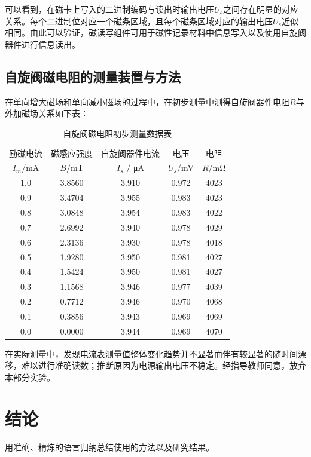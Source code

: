 \documentclass{thuemp}
\begin{document}
可以看到，在磁卡上写入的二进制编码与读出时输出电压$U_s$之间存在明显的对应关系。每个二进制位对应一个磁条区域，且每个磁条区域对应的输出电压$U_s$近似相同。由此可以验证，磁读写组件可用于磁性记录材料中信息写入以及使用自旋阀器件进行信息读出。

\subsection{自旋阀磁电阻的测量装置与方法}
在单向增大磁场和单向减小磁场的过程中，在初步测量中测得自旋阀器件电阻$R$与外加磁场关系如下表：
\begin{table}[H]
    \centering
    \captionnamefont{\wuhao\bf\heiti}
    \captiontitlefont{\wuhao\bf\heiti}
    \caption{自旋阀磁电阻初步测量数据表} \label{tab:spin_valve}
    \liuhao
    \begin{tabular}{ccccc}
        \toprule
        励磁电流& 磁感应强度 & 自旋阀器件电流 & 电压 & 电阻 \\
        $I_m$/\si{\milli\ampere} & $B/$\si{\milli\tesla} & $I_s$ / \si{\micro\ampere} & $U_s$/\si{\milli\volt} & $R/$\si{\milli\ohm} \\
        \midrule
        1.0 & 3.8560 & 3.910 & 0.972 & 4023 \\ 
        0.9 & 3.4704 & 3.955 & 0.983 & 4023 \\ 
        0.8 & 3.0848 & 3.954 & 0.983 & 4022 \\ 
        0.7 & 2.6992 & 3.940 & 0.978 & 4029 \\ 
        0.6 & 2.3136 & 3.930 & 0.978 & 4018 \\ 
        0.5 & 1.9280 & 3.950 & 0.981 & 4027 \\ 
        0.4 & 1.5424 & 3.950 & 0.981 & 4027 \\ 
        0.3 & 1.1568 & 3.946 & 0.977 & 4039 \\ 
        0.2 & 0.7712 & 3.946 & 0.970 & 4068 \\ 
        0.1 & 0.3856 & 3.943 & 0.969 & 4069 \\ 
        0.0 & 0.0000 & 3.944 & 0.969 & 4070 \\
        \bottomrule
    \end{tabular}
\end{table}

在实际测量中，发现电流表测量值整体变化趋势并不显著而伴有较显著的随时间漂移，难以进行准确读数；推断原因为电源输出电压不稳定。经指导教师同意，放弃本部分实验。

\section{结论}
用准确、精炼的语言归纳总结使用的方法以及研究结果。
\end{document}
